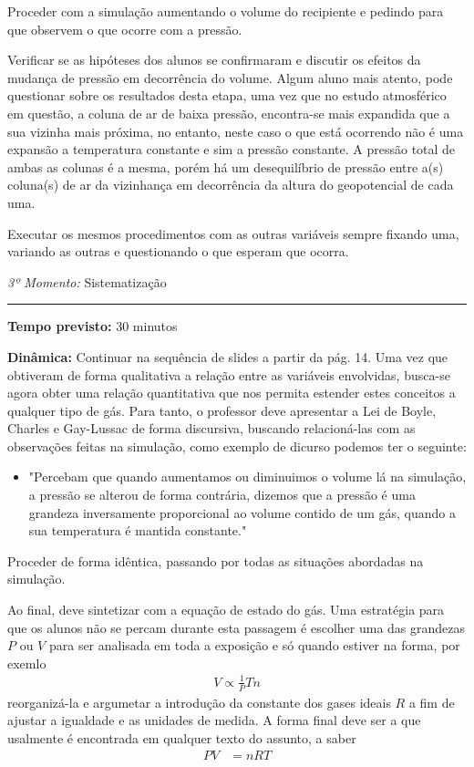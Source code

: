 \documentclass[
12pt,				%
openright,			%
oneside,			%
a4paper,			%
chapter=TITLE,		%
english,			%
brazil				%
]{abntex2}
\begin{document}
Proceder com a simulação aumentando o volume do recipiente e pedindo para que observem o que ocorre com a pressão.

Verificar se as hipóteses dos alunos se confirmaram e discutir os efeitos da mudança de pressão em decorrência do volume. Algum aluno mais atento, pode questionar sobre os resultados desta etapa, uma vez que no estudo atmosférico em questão, a coluna de ar de baixa pressão, encontra-se mais expandida que a sua vizinha mais próxima, no entanto, neste caso o que está ocorrendo não é uma expansão a temperatura constante e sim a pressão constante. A pressão total de ambas as colunas é a mesma, porém há um desequilíbrio de pressão entre a(s) coluna(s) de ar da vizinhança em decorrência da altura do geopotencial de cada uma.

Executar os mesmos procedimentos com as outras variáveis sempre fixando uma, variando as outras e questionando o que esperam que ocorra.
\vspace{50pt}
\par\noindent\emph{3º Momento:} Sistematização
\par\noindent\rule{.3\textwidth}{.5pt}
\par\noindent\textbf{Tempo previsto:} 30 minutos

\par\noindent\textbf{Dinâmica:} Continuar na sequência de slides a partir da pág. 14. Uma vez que obtiveram de forma qualitativa a relação entre as variáveis envolvidas, busca-se agora obter uma relação quantitativa que nos permita estender estes conceitos a qualquer tipo de gás. Para tanto, o professor deve apresentar a Lei de Boyle, Charles e Gay-Lussac de forma discursiva, buscando relacioná-las com as observações feitas na simulação, como exemplo de dicurso podemos ter o seguinte:

\begin{itemize}
		\item "Percebam que quando aumentamos ou diminuimos o volume lá na simulação, a pressão se alterou de forma contrária, dizemos que a pressão é uma grandeza inversamente proporcional ao volume contido de um gás, quando a sua temperatura é mantida constante."
\end{itemize}

Proceder de forma idêntica, passando por todas as situações abordadas na simulação.

Ao final, deve sintetizar com a equação de estado do gás. Uma estratégia para que os alunos não se percam durante esta passagem é escolher uma das grandezas $P$ ou $V$ para ser analisada em toda a exposição e só quando estiver na forma, por exemlo
\begin{align}
		V\propto \frac{1}{P}Tn
\end{align}
reorganizá-la e argumetar a introdução da constante dos gases ideais $R$ a fim de ajustar a igualdade e as unidades de medida. A forma final deve ser a que usalmente é encontrada em qualquer texto do assunto, a saber
\begin{align}
	PV&=nRT
\end{align}
\end{document}
